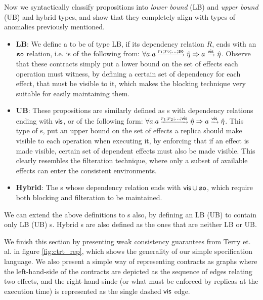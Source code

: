 Now we syntactically  classify propositions into \emph{lower bound} (LB) and
\emph{upper bound} (UB) and hybrid types, and show that they completely
align with types of
anomalies previously mentioned. 
\begin{itemize}
\item {\bf LB}: We define a \propS{} to be of type LB, 
if its dependency relation $R$, ends with an ${\normalfont \texttt{so}}$ relation, i.e. is of
the following from: $\scriptsize \forall a. a
\xrightarrow{r_1;r_2;...;{\normalfont \texttt{so}}} \hat{\eta}
\Rightarrow a \xrightarrow{{\normalfont \textsf{vis}}} \hat{\eta}$.
Observe that these contracts simply put a lower bound on the set of
effects each operation must witness, by defining a certain set of
dependency for each effect, that must be visible to it, which makes the
blocking technique very suitable for easily maintaining them.
\item {\bf UB}:  These propositions are similarly defined as \propS{}s
with dependency relations ending with ${\normalfont \textsf{vis}}$, or of the following form: 
$\scriptsize \forall a. a\xrightarrow{r_1;r_2;...;{\normalfont \textsf{vis}}} \hat{\eta}
\Rightarrow a \xrightarrow{{\normalfont \textsf{vis}}} \hat{\eta}$.
This type of \propS{}s, put an upper bound on the set of effects 
a replica should make visible to each operation when executing it, by
enforcing that if an effect is made visible, certain set of dependent
effects must also be made visible. This clearly resembles the
filteration technique, where only a subset of available effects can enter
the consistent environments.
\item {\bf Hybrid}: The \propS{}s whose dependency relation ends with
${\normalfont \textsf{vis}}\cup {\normalfont \texttt{so}}$, which require both blocking and filteration to be
maintained. 
\end{itemize}
We can extend the above definitions to \specS{}s also, by defining an LB
(UB) \specS{} to contain only LB (UB) \propS{}s. Hybrid \specS{}s are also
defined as the ones that are neither LB or UB.

We finish this section by presenting weak consistency guarantees from
Terry et. al. in figure \ref{fig:ctrt_rep}, which shows the generality
of our simple specification language. We also present a simple way of
representing contracts as graphs where the left-hand-side of the
contracts are depicted as the sequence of edges relating two effects,
and the right-hand-sinde (or what must be enforced by replicas at the
execution time) is represented as the single dashed ${\normalfont \textsf{vis}}$ edge.
%
